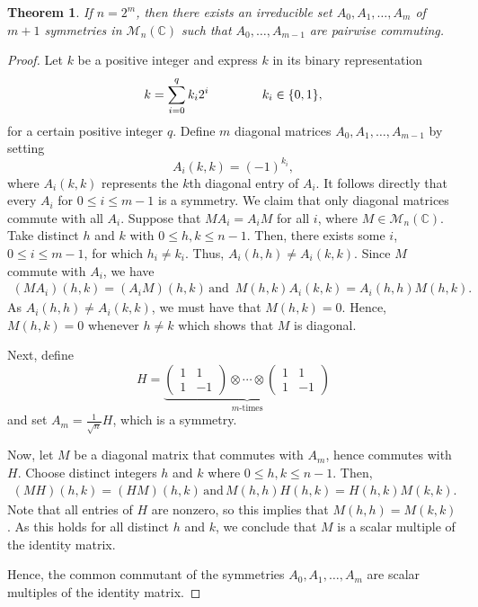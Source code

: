\documentclass{amsart}
\newtheorem{theorem}{Theorem}[section]
\theoremstyle{definition}
\theoremstyle{remark}
\newcommand{\M}{\mathcal{M}}
\numberwithin{equation}{section}
\begin{document}
\begin{theorem}\label{semiclassical}
If $n = 2^m$, then there exists an irreducible set $A_0, A_1,\ldots, A_m$ of $m+1$ symmetries in $\M_n(\mathbb C)$ such that $A_0,\dots,A_{m-1}$ are pairwise
commuting. 
\end{theorem}
\begin{proof}
	Let $k$ be a  positive integer and express $k$ in its binary representation  $$k=\sum_{i=0}^{q}k_i2^i \hspace*{1.5cm}k_i\in\{0,1\},$$  
	for a certain positive integer $q$. Define $m$ diagonal matrices $A_0, A_1,\ldots, A_{m-1}$ by setting $$A_i(k,k)=(-1)^{k_i},$$
	where $A_i(k,k)$ represents the $k$th diagonal entry of $A_i$.
	It follows directly that every  $A_i$ for $0\leq i \leq {m-1}$ is a symmetry. We claim that only diagonal matrices commute with all $A_i$. Suppose that $MA_i=A_iM$ for all $i$, where  $M\in \M_n(\mathbb C)$. Take distinct $h$ and $k$ with $0\leq h,k \leq {n-1}$. Then, there exists some $i$, $0\leq i \leq {m-1}$, for which $h_i \neq k_i$. Thus, $A_i(h,h)\neq A_i(k,k)$. Since $M$ commute with $A_i$, we have 
	\begin{align*}
		(MA_i)(h,k)=(A_iM)(h,k) \,\mbox{and }\,  M(h,k)A_i(k,k)=A_i(h,h)M(h,k).	
	\end{align*}
	As $A_i(h,h)\neq A_i(k,k)$, we must have that $M(h,k)=0$. Hence, $M(h,k)=0$ whenever $h\neq k$ which shows that $M$ is diagonal.
	
	Next, define 
	\[
	H = \underbrace{
		\begin{pmatrix}
			1 & 1 \\
			1 & -1
		\end{pmatrix}
		\otimes
		\cdots
		\otimes
		\begin{pmatrix}
			1 & 1 \\
			1 & -1
	\end{pmatrix}}_{m\text{-times}}
	\]
	and set $A_m=\frac{1}{\sqrt{n}}H$, which is a symmetry.
	
	Now, let $M$ be a diagonal matrix that commutes with $A_m$, hence commutes with $H$. Choose distinct integers $h$ and $k$ where $0\leq h,k\leq n-1$. Then,
	\begin{align*}
		(MH)(h,k)=(HM)(h,k)\, \mbox{and}\,  M(h,h)H(h,k)=H(h,k)M(k,k).
	\end{align*}
	Note that all entries of $H$ are nonzero, so this implies that $M(h,h)=M(k,k)$. As this holds for all distinct $h$ and $k$, we conclude that $M$ is a scalar multiple of the identity matrix. 
	
	Hence, the common commutant of the symmetries  $A_0,A_1,\ldots,A_m$ 
	are scalar multiples of the identity matrix. 
	\end{proof}
\end{document}

